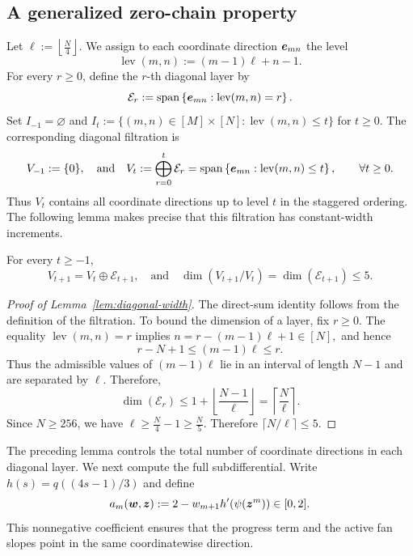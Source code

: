 \subsection{A generalized zero-chain property} 
\label{sec:locality} 
Let
$
 {\ell:=\left\lfloor\frac N4\right\rfloor.}
$ 
We assign to each coordinate direction \(\bm{e}_{mn}\) the level
\[
 \operatorname{lev}(m,n):=(m-1){\ell}+n-1.
\]
For every \(r\geq0\), define the \(r\)-th diagonal layer by
\[
 \mathcal E_r
 :=
 \operatorname{span}
 \left\{
   \bm{e}_{mn}:
   \operatorname{lev}(m,n)=r
 \right\}.
\]
Set $I_{-1}=\varnothing$ and
$I_t:=\{(m,n)\in[M]\times[N]:\operatorname{lev}(m,n)\le t\}$
for $t\ge0$. The corresponding diagonal filtration is 
\begin{equation}
\label{newrand:filtration}
 {V}_{-1}:=\{0\},
 \quad \text{and} \quad
 {V}_t
 :=
 \bigoplus_{r=0}^t\mathcal E_r
 =
 \operatorname{span}
 \left\{
   \bm{e}_{mn}:
   \operatorname{lev}(m,n)\leq t
 \right\},
 \qquad  \forall t\geq0.
\end{equation}
Thus \({V}_t\) contains all coordinate directions up to level \(t\)
in the staggered ordering.  The following lemma makes precise that this
filtration has constant-width increments. 

\begin{lemma}
\label{lem:diagonal-width}
For every \(t\geq-1\),
\[
 {V}_{t+1}
 =
 {V}_t\oplus\mathcal E_{t+1},
 \quad \text{and} \quad
 \dim\left(
   {V}_{t+1}/{V}_t
 \right)
 =
 \dim(\mathcal E_{t+1})
 \leq{5}.
\]
\end{lemma}
\begin{proof}[Proof of Lemma~\ref{lem:diagonal-width}]
The direct-sum identity follows from the definition of the filtration.
To bound the dimension of a layer, fix \(r\geq0\).  The equality
\(\operatorname{lev}(m,n)=r\) implies
$
 n=r-(m-1){\ell}+1\in[N],
$
and hence
\[
 r-N+1
 \leq
 (m-1){\ell}
 \leq
 r.
\]
Thus the admissible values of \((m-1){\ell}\) lie in an interval of length
\(N-1\) and are separated by \({\ell}\).  Therefore,
\[
 \dim(\mathcal E_r)
 \leq
 1+\left\lfloor\frac{N-1}{{\ell}}\right\rfloor
 =
 \left\lceil\frac N{{\ell}}\right\rceil.
\]
Since {\(N\geq256\)},
we have $
 {\ell}
 \geq
 {\tfrac N4-1}
 \geq
 {\tfrac N5}.
$
Therefore \(\lceil N/{\ell}\rceil\leq{5}\).
\end{proof}
The preceding lemma controls the total number of coordinate directions in
each diagonal layer. 
We next compute the full subdifferential. Write
$h(s)=q((4s-1)/3)$ and define
\[
 a_m(\bm w,\bm{z}):=2-w_{m+1}h'(\psi(\bm{z}^m))\in[0,2].
\]
This nonnegative coefficient ensures that the progress term and
the active fan slopes point in the same coordinatewise direction.


